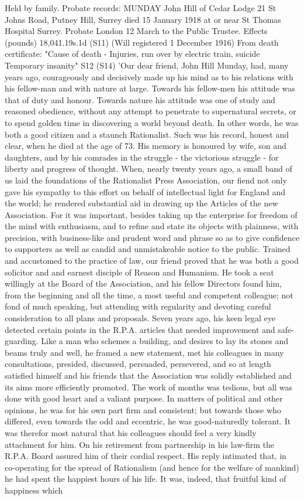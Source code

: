     Held by family.
      Probate records: MUNDAY John Hill of Cedar Lodge 21 St Johns Road, Putney Hill, Surrey died 15 January 1918 at or near St Thomas Hospital Surrey. Probate London 12 March to the Public Trustee. Effects (pounds) 18,041.19s.1d (S11) (Will registered 1 December 1916)
      From death certificate: "Cause of death - Injuries, run over by electric train, suicide Temporary insanity" S12
      (S14)
    'Our dear friend, John Hill Munday, had, many years ago, courageously and decisively made up his mind as to his relations with his fellow-man and with nature at large. Towards his fellow-men his attitude was that of duty and honour. Towards nature his attitude was one of study and reasoned obedience, without any attempt to penetrate to supernatural secrets, or to spend golden time in discovering a world beyond death. In other words, he was both a good citizen and a staunch Rationalist. Such was his record, honest and clear, when he died at the age of 73. His memory is honoured by wife, son and daughters, and by his comrades in the struggle - the victorious struggle - for liberty and progress of thought. When, nearly twenty years ago, a small band of us laid the foundations of the Rationalist Press Association, our fiend not only gave his sympathy to this effort on behalf of intellectual light for England and the world; he rendered substantial aid in drawing up the Articles of the new Association. For it was important, besides taking up the enterprise for freedom of the mind with enthusiasm, and to refine and state its objects with plainness, with precision, with business-like and prudent word and phrase so as to give confidence to supporters as well as candid and unmistakeable notice to the public. Trained and accustomed to the practice of law, our friend proved that he was both a good solicitor and and earnest disciple of Reason and Humanism. He took a seat willingly at the Board of the Association, and his fellow Directors found him, from the beginning and all the time, a most useful and competent colleague; not fond of much speaking, but attending with regularity and devoting careful consideration to all plans and proposals. Seven years ago, his keen legal eye detected certain points in the R.P.A. articles that needed improvement and safe-guarding. Like a man who schemes a building, and desires to lay its stones and beams truly and well, he framed a new statement, met his colleagues in many consultations, presided, discussed, persuaded, persevered, and so at length satisfied himself and his friends that the Association was solidly established and its aims more efficiently promoted. The work of months was tedious, but all was done with good heart and a valiant purpose. In matters of political and other opinions, he was for his own part firm and consistent; but towards those who differed, even towards the odd and eccentric, he was good-naturedly tolerant. It was therefor most natural that his colleagues should feel a very kindly attachment for him. On his retirement from partnership in his law-firm the R.P.A. Board assured him of their cordial respect. His reply intimated that, in co-operating for the spread of Rationalism (and hence for the welfare of mankind) he had spent the happiest hours of his life. It was, indeed, that fruitful kind of happiness which 